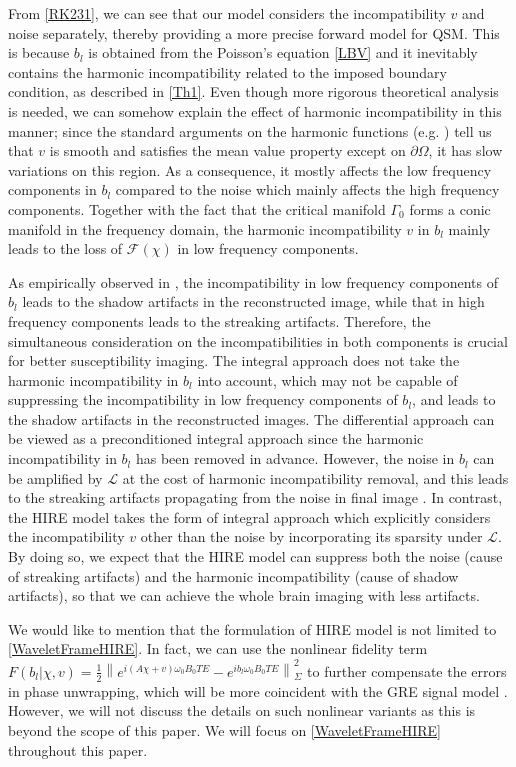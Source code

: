 \documentclass[reqno]{siamonline1116}
\numberwithin{theorem}{section}
\numberwithin{equation}{section}
\def\Om{\Omega}
\def\om{\omega}
\def\f{\frac}
\def\p{\partial}
\def\msF{{\mathscr F}}
\def\msL{{\mathscr L}}
\begin{document}
From \cref{RK231}, we can see that our model considers the incompatibility $v$ and noise separately, thereby providing a more precise forward model for QSM. This is because $b_l$ is obtained from the Poisson's equation \cref{LBV} and it inevitably contains the harmonic incompatibility related to the imposed boundary condition, as described in \cref{Th1}. Even though more rigorous theoretical analysis is needed, we can somehow explain the effect of harmonic incompatibility in this manner; since the standard arguments on the harmonic functions (e.g. \cite{Evans2010}) tell us that $v$ is smooth and satisfies the mean value property except on $\p\Om$, it has slow variations on this region. As a consequence, it mostly affects the low frequency components in $b_l$ compared to the noise which mainly affects the high frequency components. Together with the fact that the critical manifold $\Gamma_0$ forms a conic manifold in the frequency domain, the harmonic incompatibility $v$ in $b_l$ mainly leads to the loss of $\msF(\chi)$ in low frequency components.

As empirically observed in \cite{Y.Kee2017}, the incompatibility in low frequency components of $b_l$ leads to the shadow artifacts in the reconstructed image, while that in high frequency components leads to the streaking artifacts. Therefore, the simultaneous consideration on the incompatibilities in both components is crucial for better susceptibility imaging. The integral approach does not take the harmonic incompatibility in $b_l$ into account, which may not be capable of suppressing the incompatibility in low frequency components of $b_l$, and leads to the shadow artifacts in the reconstructed images. The differential approach can be viewed as a preconditioned integral approach since the harmonic incompatibility in $b_l$ has been removed in advance. However, the noise in $b_l$ can be amplified by $\msL$ at the cost of harmonic incompatibility removal, and this leads to the streaking artifacts propagating from the noise in final image \cite{Y.Wang2015}. In contrast, the HIRE model takes the form of integral approach which explicitly considers the incompatibility $v$ other than the noise by incorporating its sparsity under $\msL$. By doing so, we expect that the HIRE model can suppress both the noise (cause of streaking artifacts) and the harmonic incompatibility (cause of shadow artifacts), so that we can achieve the whole brain imaging with less artifacts.

We would like to mention that the formulation of HIRE model is not limited to \cref{WaveletFrameHIRE}. In fact, we can use the nonlinear fidelity term $F(b_l|\chi,v)=\f{1}{2}\left\|e^{i(A\chi+v)\om_0B_0TE}-e^{ib_l\om_0B_0TE}\right\|_{\Sigma}^2$ to further compensate the errors in phase unwrapping, which will be more coincident with the GRE signal model \cite{Y.Kee2017,T.Liu2013}. However, we will not discuss the details on such nonlinear variants as this is beyond the scope of this paper. We will focus on \cref{WaveletFrameHIRE} throughout this paper.
\end{document}
